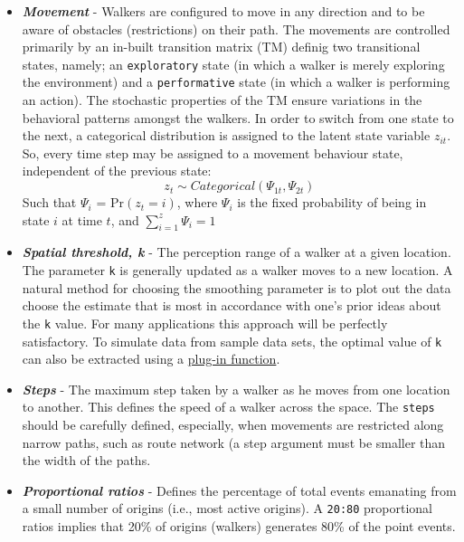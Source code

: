 \documentclass[
  16pt,
]{article}
\begin{document}
\begin{itemize}
\item
  \textbf{\emph{Movement}} - Walkers are configured to move in any
  direction and to be aware of obstacles (restrictions) on their path.
  The movements are controlled primarily by an in-built transition
  matrix (TM) definig two transitional states, namely; an
  \texttt{exploratory} state (in which a walker is merely exploring the
  environment) and a \texttt{performative} state (in which a walker is
  performing an action). The stochastic properties of the TM ensure
  variations in the behavioral patterns amongst the walkers. In order to
  switch from one state to the next, a categorical distribution is
  assigned to the latent state variable \(z_{it}\). So, every time step
  may be assigned to a movement behaviour state, independent of the
  previous state: \[z_t \sim Categorical(\Psi{_{1t}}, \Psi{_{2t}})\]
  Such that \(\Psi{_{i}}\) = Pr\((z_t = i)\), where \(\Psi{_{i}}\) is
  the fixed probability of being in state \(i\) at time \(t\), and
  \(\sum_{i=1}^{z}\Psi{_{i}}=1\)
\item
  \textbf{\emph{Spatial threshold, k}} - The perception range of a
  walker at a given location. The parameter \texttt{k} is generally
  updated as a walker moves to a new location. A natural method for
  choosing the smoothing parameter is to plot out the data choose the
  estimate that is most in accordance with one's prior ideas about the
  \texttt{k} value. For many applications this approach will be
  perfectly satisfactory. To simulate data from sample data sets, the
  optimal value of \texttt{k} can also be extracted using a
  \href{https://www.taylorfrancis.com/books/mono/10.1201/9781315140919/density-estimation-statistics-data-analysis-silverman}{plug-in
  function}.
\item
  \textbf{\emph{Steps}} - The maximum step taken by a walker as he moves
  from one location to another. This defines the speed of a walker
  across the space. The \texttt{steps} should be carefully defined,
  especially, when movements are restricted along narrow paths, such as
  route network (a step argument must be smaller than the width of the
  paths.
\item
  \textbf{\emph{Proportional ratios}} - Defines the percentage of total
  events emanating from a small number of origins (i.e., most active
  origins). A \texttt{20:80} proportional ratios implies that 20\% of
  origins (walkers) generates 80\% of the point events.
\end{itemize}
\end{document}
